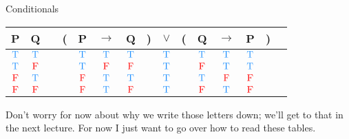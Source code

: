 \documentclass[
  ignorenonframetext,
]{beamer}
\renewcommand{\,}{\text{, }}
\def\True{\textcolor{dodgerblue}{\text{T}}}
\def\False{\textcolor{red}{\text{F}}}
\begin{document}
\begin{frame}{Conditionals}
\protect\hypertarget{conditionals}{}

\begin{center}
\begin{tabular}{@{ }c@{ }@{ }c | c@{ }@{}c@{}@{ }c@{ }@{ }c@{ }@{ }c@{ }@{}c@{}@{ }c@{ }@{}c@{}@{ }c@{ }@{ }c@{ }@{ }c@{ }@{}c@{}@{ }c}
P & Q &  & ( & P & $\rightarrow$ & Q & ) & $\lor$ & ( & Q & $\rightarrow$ & P & ) & \\
\hline 
$\True$ & $\True$ &  &  & $\True$ & $\True$ & $\True$ &  & \textcolor{red}{$\True$} &  & $\True$ & $\True$ & $\True$ &  & \\
$\True$ & $\False$ &  &  & $\True$ & $\False$ & $\False$ &  & \textcolor{red}{$\True$} &  & $\False$ & $\True$ & $\True$ &  & \\
$\False$ & $\True$ &  &  & $\False$ & $\True$ & $\True$ &  & \textcolor{red}{$\True$} &  & $\True$ & $\False$ & $\False$ &  & \\
$\False$ & $\False$ &  &  & $\False$ & $\True$ & $\False$ &  & \textcolor{red}{$\True$} &  & $\False$ & $\True$ & $\False$ &  & \\
\end{tabular}
\bigskip
\end{center}

Don't worry for now about why we write those letters down; we'll get to
that in the next lecture. For now I just want to go over how to read
these tables.

\end{frame}
\end{document}
